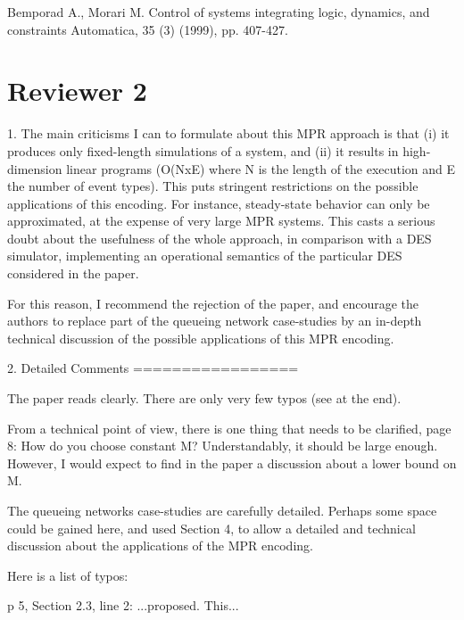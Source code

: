 \documentclass[suppldata]{interact}
\begin{document}
Bemporad A., Morari M.
Control of systems integrating logic, dynamics, and constraints
Automatica, 35 (3) (1999), pp. 407-427.

\section{Reviewer 2}

1. The main criticisms I can to formulate about this MPR approach is that
(i) it produces only fixed-length simulations of a system, and (ii) it
results in high-dimension linear programs (O(NxE) where N is the
length of the execution and E the number of event types). This puts
stringent restrictions on the possible applications of this
encoding. For instance, steady-state behavior can only be
approximated, at the expense of very large MPR systems. This casts a
serious doubt about the usefulness of the whole approach, in
comparison with a DES simulator, implementing an operational
semantics of the particular DES considered in the paper.

For this reason, I recommend the rejection of the paper, and encourage
the authors to replace part of the queueing network case-studies by an
in-depth technical discussion of the possible applications of this MPR
encoding.

2. Detailed Comments
=================

The paper reads clearly. There are only very few typos (see at the
end).

From a technical point of view, there is one thing that needs to be
clarified, page 8: How do you choose constant M? Understandably, it
should be large enough. However, I would expect to find in the paper a
discussion about a lower bound on M.

The queueing networks case-studies are carefully detailed. Perhaps
some space could be gained here, and used Section 4, to allow a
detailed and technical discussion about the applications of the MPR
encoding.

Here is a list of typos:

p 5, Section 2.3, line 2: ...proposed. This...
\end{document}
